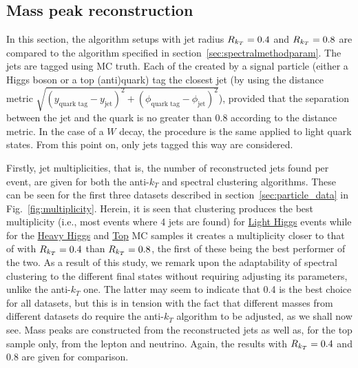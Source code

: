 \subsection{Mass peak reconstruction}
In this section, the \antikt{} algorithm setups with jet radius \(R_{k_T}{} = 0.4\) and \(R_{k_T}{} = 0.8\)
are compared to the \spectral{} algorithm specified in section~\ref{sec:spectralmethodparam}.
The jets are tagged using MC truth.
Each of the  created by a signal particle (either a Higgs boson or a top (anti)quark)
tag the closest jet (by using the distance metric \(\sqrt{(y_\text{quark tag} - y_\text{jet})^2 + (\phi_\text{quark tag} - \phi_\text{jet})^2}\)),
provided that the separation between the jet and the quark is no greater than \(0.8\) according to the distance metric.
In the case of a \(W\) decay, the procedure is the same applied to light quark states.
From this point on, only jets tagged this way are considered.


Firstly, jet multiplicities, that is, the number of reconstructed jets found per event, are given for both the anti-$k_T$ and spectral clustering algorithms.
These can be seen for the first three datasets described in section~\ref{sec:particle_data} in Fig.~\ref{fig:multiplicity}. Herein, it
 is seen that \spectral{} clustering produces the best multiplicity (i.e., most events where 4 jets are found) for \underline{Light Higgs} events while for 
         the \underline{Heavy Higgs} and \underline{Top} MC samples  
        it creates a multiplicity closer to that of \antikt{} with \(R_{k_T}{} = 0.4\) 
        than \(R_{k_T}{} = 0.8\), the first of these being the best performer of the two. As a result of this study, we remark upon the adaptability of spectral clustering to the different final states without requiring adjusting its parameters, unlike the anti-$k_T$ one. The latter may seem to indicate that 0.4 is the best choice for all datasets, but this is in tension with the fact that different masses from different datasets do require the  anti-$k_T$ algorithm to be adjusted, as we shall now see. 
Mass peaks are constructed from the reconstructed jets as well as, for the top sample only, from the lepton and neutrino.
Again, the \antikt{} results  with \(R{}_{k_T} = 0.4\) and \(0.8\) are given for comparison.



